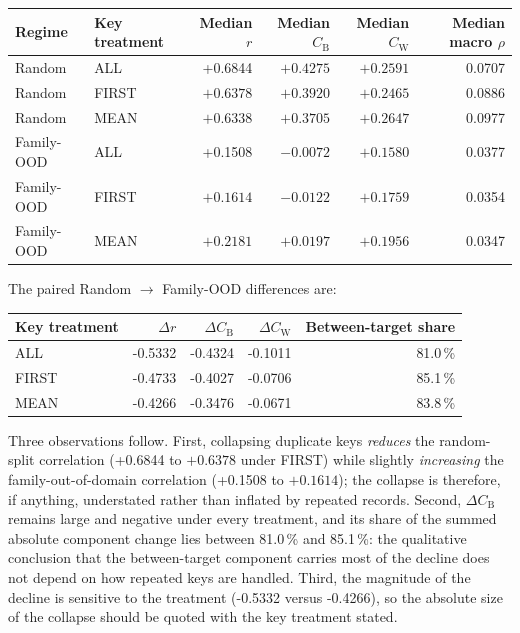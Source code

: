 \documentclass[11pt,a4paper]{article}
\begin{document}
\begin{center}
\begin{tabular}{@{}llrrrr@{}}
\toprule
Regime & Key treatment & Median $r$ & Median $C_{\mathrm{B}}$
  & Median $C_{\mathrm{W}}$ & Median macro $\rho$ \\
\midrule
Random & ALL & +0.6844 & $+0.4275$ & $+0.2591$ & 0.0707 \\
Random & FIRST & $+0.6378$ & $+0.3920$ & $+0.2465$ & 0.0886 \\
Random & MEAN & $+0.6338$ & $+0.3705$ & $+0.2647$ & 0.0977 \\
\midrule
Family-OOD & ALL & +0.1508 & $-0.0072$ & $+0.1580$ & 0.0377 \\
Family-OOD & FIRST & $+0.1614$ & $-0.0122$ & $+0.1759$ & 0.0354 \\
Family-OOD & MEAN & $+0.2181$ & $+0.0197$ & $+0.1956$ & 0.0347 \\
\bottomrule
\end{tabular}
\end{center}

The paired Random $\to$ Family-OOD differences are:
\begin{center}
\begin{tabular}{@{}lrrrr@{}}
\toprule
Key treatment & $\Delta r$ & $\Delta C_{\mathrm{B}}$ & $\Delta C_{\mathrm{W}}$
  & Between-target share \\
\midrule
ALL   & -0.5332 & -0.4324 & -0.1011 & 81.0\,\% \\
FIRST & -0.4733 & -0.4027 & -0.0706 & 85.1\,\% \\
MEAN  & -0.4266 & -0.3476 & -0.0671 & 83.8\,\% \\
\bottomrule
\end{tabular}
\end{center}

Three observations follow. First, collapsing duplicate keys \emph{reduces} the random-split
correlation (+0.6844 to $+0.6378$ under FIRST) while slightly \emph{increasing} the
family-out-of-domain correlation (+0.1508 to $+0.1614$); the collapse is therefore, if
anything, understated rather than inflated by repeated records. Second, $\Delta C_{\mathrm{B}}$
remains large and negative under every treatment, and its share of the summed absolute
component change lies between 81.0\,\% and 85.1\,\%: the qualitative conclusion that the
between-target component carries most of the decline does not depend on how repeated keys are
handled. Third, the magnitude of the decline is sensitive to the treatment
(-0.5332 versus -0.4266), so the absolute size of the collapse should be quoted with the key
treatment stated.
\end{document}
